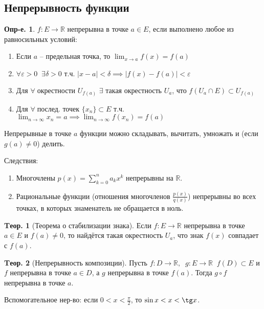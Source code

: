 \documentclass[a4paper,12pt]{article}
\numberwithin{figure}{section}
\theoremstyle{definition}
\newtheorem{definition}{Опр-е.}[section]
\theoremstyle{definition}
\newtheorem{theorem}{Tеор.}[section]
\def\.{\;\;}
\def\DS{\displaystyle}
\def\eps{\varepsilon}
\def\ntoinf{n \to \infty}
\def\mathR{\mathbb{R}}
\def\on{\!:}
\def\any {$\forall\;$}
\begin{document}
\subsection{Непрерывность функции}

\begin{definition}
  $f\on E\to\mathR$ непрерывна в точке $a \in E$,
  если выполнено любое из равносильных условий:
  \begin{enumerate}
	\item Если $a$ -- предельная точка, то $\DS \lim_{x\to a}f(x)=f(a)$
	\item $\DS \forall\eps>0 \. \exists\delta>0 \text{ т.ч. }
		   |x-a|<\delta \implies |f(x)-f(a)|<\eps$
	\item Для \any окрестности $U_{f(a)}$ $\exists$ такая окрестность $U_a$,
		  что $f(U_a \cap E) \subset U_{f(a)}$
	\item Для \any послед. точек $\{x_n\} \subset E$ т.ч.
		  $\DS \lim_{\ntoinf}x_n=a \implies \lim_{\ntoinf}f(x_n)=f(a)$
  \end{enumerate}
\end{definition}

Непрерывные в точке $a$ функции можно складывать, вычитать, умножать и (если $g(a)\ne0$) делить.

\bigbreak
Следствия: \begin{enumerate}
	\item Многочлены $\DS p(x)=\sum_{k=0}^n a_kx^k$ непрерывны на $\mathR$.
	\item Рациональные функции (отношения многочленов $\DS \frac{p(x)}{q(x)}$)
		  непрерывны во всех точках, в которых знаменатель не обращается в ноль.
\end{enumerate}

\begin{theorem}[Теорема о стабилизации знака]
	Если $f\on E\to\mathR$ непрерывна в точке $a \in E$ и $f(a)\ne0$,
	то найдётся такая окрестность $U_a$, что знак $f(x)$ совпадает с $f(a)$.
\end{theorem}

\begin{theorem}[Непрерывность композиции]
	Пусть $f\on D\to\mathR, \. g\on E\to\mathR \. f(D)\subset E$ и
	$f$ непрерывна в точке $a\in D$, а $g$ непрерывна в точке $f(a)$.
	Тогда $g \circ f$ непрерывна в точке $a$.
\end{theorem}

Вспомогательное нер-во: если $0<x<\frac\pi2$, то $\sin x<x<\tg x$.
\end{document}
